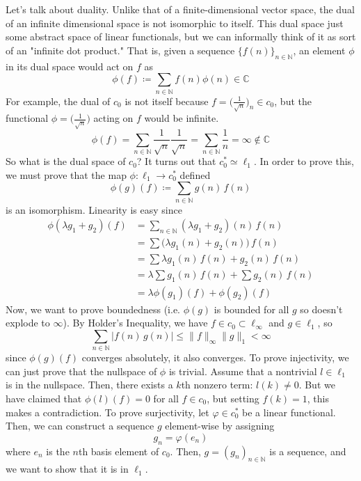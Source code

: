 	Let's talk about duality. Unlike that of a finite-dimensional vector space, the dual of an infinite dimensional space is not isomorphic to itself. This dual space just some abstract space of linear functionals, but we can informally think of it as sort of an "infinite dot product." That is, given a sequence $\{ f(n) \}_{n \in \mathbb{N}}$, an element $\phi$ in its dual space would act on $f$ as 
	\begin{equation}
	  \phi(f) \coloneqq \sum_{n \in \mathbb{N}} f(n) \phi(n) \in \mathbb{C}
	\end{equation}
	For example, the dual of $c_0$ is not itself because $f = \big(\frac{1}{\sqrt{n}}\big)_n \in c_0$, but the functional $\phi = \big(\frac{1}{\sqrt{n}} \big)$ acting on $f$ would be infinite. 
	\begin{equation}
	  \phi(f) = \sum_{n \in \mathbb{N}} \frac{1}{\sqrt{n}} \frac{1}{\sqrt{n}} = \sum_{n \in \mathbb{N}} \frac{1}{n} = \infty \not\in \mathbb{C}
	\end{equation}
	So what is the dual space of $c_0$? It turns out that $c_0^* \simeq \ell_1$. In order to prove this, we must prove that the map $\phi: \ell_1 \to c_0^*$ defined 
	\begin{equation}
	  \phi(g) (f) \coloneqq \sum_{n \in \mathbb{N}} g(n) \, f(n)
	\end{equation}
	is an isomorphism. Linearity is easy since 
	\begin{align*}
			\phi(\lambda g_1 + g_2) (f) & = \sum_{n \in \mathbb{N}} (\lambda g_1 + g_2) (n) \, f(n) \\
			& = \sum \big( \lambda g_1 (n) + g_2 (n) \big) \, f(n) \\
			& = \sum \lambda g_1(n) \, f(n) + g_2 (n) \, f(n) \\
			& = \lambda \sum g_1(n) \, f(n) + \sum g_2(n) \, f(n) \\
			& = \lambda \phi(g_1) (f) + \phi (g_2) (f)
	\end{align*}
	Now, we want to prove boundedness (i.e. $\phi(g)$ is bounded for all $g$ so doesn't explode to $\infty$). By Holder's Inequality, we have $f \in c_0 \subset \ell_\infty$ and $g \in \ell_1$, so 
	\begin{equation}
	  \sum_{n \in \mathbb{N}} |f(n) \, g(n)| \leq \|f\|_\infty \|g\|_1 < \infty
	\end{equation}
	since $\phi(g)(f)$ converges absolutely, it also converges. To prove injectivity, we can just prove that the nullspace of $\phi$ is trivial. Assume that a nontrivial $l \in \ell_1$ is in the nullspace. Then, there exists a $k$th nonzero term: $l(k) \neq 0$. But we have claimed that $\phi(l)(f) = 0$ for all $f \in c_0$, but setting $f(k) = 1$, this makes a contradiction. To prove surjectivity, let $\varphi \in c_0^*$ be a linear functional. Then, we can construct a sequence $g$ element-wise by assigning 
	\begin{equation}
	  g_n = \varphi(e_n)
	\end{equation}
	where $e_n$ is the $n$th basis element of $c_0$. Then, $g = (g_n)_{n \in \mathbb{N}}$ is a sequence, and we want to show that it is in $\ell_1$. 

